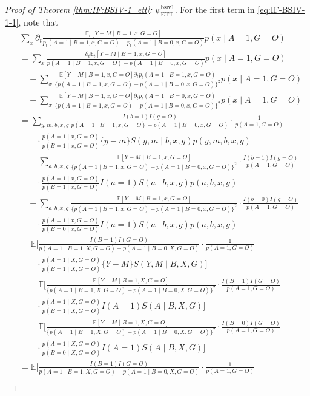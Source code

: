 \documentclass[10pt]{article}
\newcommand{\E}{\mathbb{E}}
\begin{document}
\begin{proof}[Proof of Theorem \ref{thm:IF:BSIV-1_ett}: $\psi_{\text{ETT}}^{\text{bsiv1}}$]
For the first term in \eqref{eq:IF-BSIV-1-1}, note that
\begingroup
\allowdisplaybreaks
\begin{align*}
&\sum_x\partial_t\frac{\E_t[Y-M\mid B=1,x,G=O]}{p_t(A=1\mid B=1,x,G=O)-p_t(A=1\mid B=0,x,G=O)}p(x\mid A=1,G=O)\\
&=\sum_x\frac{\partial_t\E_t[Y-M\mid B=1,x,G=O]}{p(A=1\mid B=1,x,G=O)-p(A=1\mid B=0,x,G=O)}p(x\mid A=1,G=O)\\
&\quad-\sum_x\frac{\E[Y-M\mid B=1,x,G=O]\partial_tp_t(A=1\mid B=1,x,G=O)}{\{p(A=1\mid B=1,x,G=O)-p(A=1\mid B=0,x,G=O)\}^2}p(x\mid A=1,G=O)\\
&\quad+\sum_x\frac{\E[Y-M\mid B=1,x,G=O]\partial_tp_t(A=1\mid B=0,x,G=O)}{\{p(A=1\mid B=1,x,G=O)-p(A=1\mid B=0,x,G=O)\}^2}p(x\mid A=1,G=O)\\
&=\sum_{y,m,b,x,g}\frac{I(b=1)I(g=O)}{p(A=1\mid B=1,x,G=O)-p(A=1\mid B=0,x,G=O)}\cdot\frac{1}{p(A=1,G=O)}\\
&\qquad\cdot\frac{p(A=1\mid x,G=O)}{p(B=1\mid x,G=O)}\{y-m\}S(y,m\mid b,x,g)p(y,m,b,x,g)\\
&\quad-\sum_{a,b,x,g}\frac{\E[Y-M\mid B=1,x,G=O]}{\{p(A=1\mid B=1,x,G=O)-p(A=1\mid B=0,x,G=O)\}^2}\cdot\frac{I(b=1)I(g=O)}{p(A=1,G=O)}\\
&\qquad\cdot \frac{p(A=1\mid x,G=O)}{p(B=1\mid x,G=O)}I(a=1) S(a\mid b,x,g)p(a,b,x,g)\\
&\quad+\sum_{a,b,x,g}\frac{\E[Y-M\mid B=1,x,G=O]}{\{p(A=1\mid B=1,x,G=O)-p(A=1\mid B=0,x,G=O)\}^2}\cdot\frac{I(b=0)I(g=O)}{p(A=1,G=O)}\\
&\qquad\cdot \frac{p(A=1\mid x,G=O)}{p(B=0\mid x,G=O)}I(a=1) S(a\mid b,x,g)p(a,b,x,g)\\
&=\E\big[\frac{I(B=1)I(G=O)}{p(A=1\mid B=1,X,G=O)-p(A=1\mid B=0,X,G=O)}\cdot\frac{1}{p(A=1,G=O)}\\
&\qquad\cdot\frac{p(A=1\mid X,G=O)}{p(B=1\mid X,G=O)}\{Y-M\}S(Y,M\mid B,X,G)\big]\\
&\quad-\E\big[\frac{\E[Y-M\mid B=1,X,G=O]}{\{p(A=1\mid B=1,X,G=O)-p(A=1\mid B=0,X,G=O)\}^2}\cdot\frac{I(B=1)I(G=O)}{p(A=1,G=O)}\\
&\qquad\cdot \frac{p(A=1\mid X,G=O)}{p(B=1\mid X,G=O)}I(A=1) S(A\mid B,X,G)\big]\\
&\quad+\E\big[\frac{\E[Y-M\mid B=1,X,G=O]}{\{p(A=1\mid B=1,X,G=O)-p(A=1\mid B=0,X,G=O)\}^2}\cdot\frac{I(B=0)I(G=O)}{p(A=1,G=O)}\\
&\qquad\cdot \frac{p(A=1\mid X,G=O)}{p(B=0\mid X,G=O)}I(A=1) S(A\mid B,X,G)\big]\\
&=\E\big[\frac{I(B=1)I(G=O)}{p(A=1\mid B=1,X,G=O)-p(A=1\mid B=0,X,G=O)}\cdot\frac{1}{p(A=1,G=O)}\\

\end{align*}
\end{proof}
\end{document}
